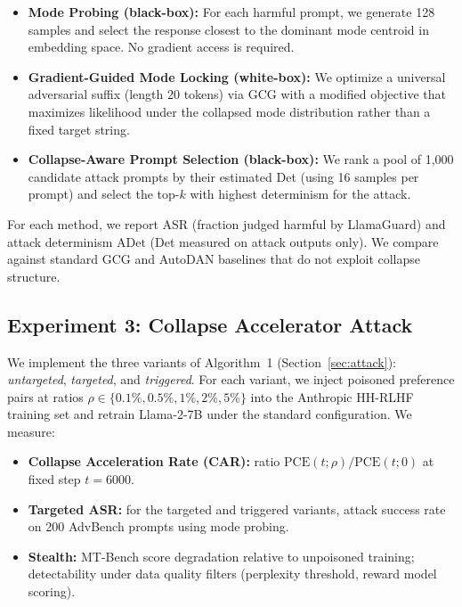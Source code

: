\begin{itemize}[leftmargin=*,nosep]
    \item \textbf{Mode Probing (black-box):} For each harmful prompt, we generate 128 samples and select the response closest to the dominant mode centroid in embedding space. No gradient access is required.
    \item \textbf{Gradient-Guided Mode Locking (white-box):} We optimize a universal adversarial suffix (length 20 tokens) via GCG \citep{zou2023universal} with a modified objective that maximizes likelihood under the collapsed mode distribution rather than a fixed target string.
    \item \textbf{Collapse-Aware Prompt Selection (black-box):} We rank a pool of 1{,}000 candidate attack prompts by their estimated Det (using 16 samples per prompt) and select the top-$k$ with highest determinism for the attack.
\end{itemize}

\noindent For each method, we report ASR (fraction judged harmful by LlamaGuard) and attack determinism $\text{ADet}$ (Det measured on attack outputs only). We compare against standard GCG and AutoDAN \citep{liu2023autodan} baselines that do not exploit collapse structure.

\subsection{Experiment 3: Collapse Accelerator Attack}
\label{sec:exp3}

We implement the three variants of Algorithm~1 (Section~\ref{sec:attack}): \textit{untargeted}, \textit{targeted}, and \textit{triggered}. For each variant, we inject poisoned preference pairs at ratios $\rho \in \{0.1\%, 0.5\%, 1\%, 2\%, 5\%\}$ into the Anthropic HH-RLHF training set and retrain Llama-2-7B under the standard configuration. We measure:

\begin{itemize}[leftmargin=*,nosep]
    \item \textbf{Collapse Acceleration Rate (CAR):} ratio $\text{PCE}(t; \rho) / \text{PCE}(t; 0)$ at fixed step $t = 6000$.
    \item \textbf{Targeted ASR:} for the targeted and triggered variants, attack success rate on 200 AdvBench prompts using mode probing.
    \item \textbf{Stealth:} MT-Bench score degradation relative to unpoisoned training; detectability under data quality filters (perplexity threshold, reward model scoring).
\end{itemize}

